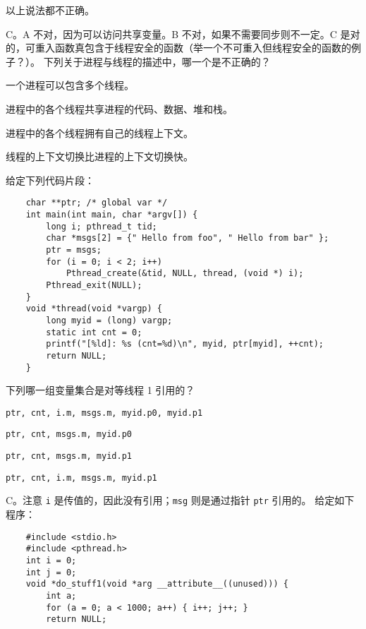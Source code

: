 \begin{problems}
\begin{choices}
            \item 以上说法都不正确。
        \end{choices}
        \sol C。A 不对，因为可以访问共享变量。B 不对，如果不需要同步则不一定。C 是对的，可重入函数真包含于线程安全的函数（举一个不可重入但线程安全的函数的例子？）。
         下列关于进程与线程的描述中，哪一个是不正确的？
        \begin{choices}
            \item 一个进程可以包含多个线程。
            \item 进程中的各个线程共享进程的代码、数据、堆和栈。
            \item 进程中的各个线程拥有自己的线程上下文。
            \item 线程的上下文切换比进程的上下文切换快。
        \end{choices}
         给定下列代码片段：
        \begin{verbatim}
    char **ptr; /* global var */
    int main(int main, char *argv[]) {
        long i; pthread_t tid;
        char *msgs[2] = {" Hello from foo", " Hello from bar" };
        ptr = msgs;
        for (i = 0; i < 2; i++)
            Pthread_create(&tid, NULL, thread, (void *) i);
        Pthread_exit(NULL);
    }
    void *thread(void *vargp) {
        long myid = (long) vargp;
        static int cnt = 0;
        printf("[%ld]: %s (cnt=%d)\n", myid, ptr[myid], ++cnt);
        return NULL;
    }
        \end{verbatim}
        下列哪一组变量集合是对等线程 1 引用的？
        \begin{choices}
            \item \verb|ptr, cnt, i.m, msgs.m, myid.p0, myid.p1|
            \item \verb|ptr, cnt, msgs.m, myid.p0|
            \item \verb|ptr, cnt, msgs.m, myid.p1|
            \item \verb|ptr, cnt, i.m, msgs.m, myid.p1|
        \end{choices}
        \sol C。注意 \verb|i| 是传值的，因此没有引用；\verb|msg| 则是通过指针 \verb|ptr| 引用的。
         给定如下程序：
        \begin{verbatim}
    #include <stdio.h>
    #include <pthread.h>
    int i = 0;
    int j = 0;
    void *do_stuff1(void *arg __attribute__((unused))) {
        int a;
        for (a = 0; a < 1000; a++) { i++; j++; }
        return NULL;

\end{verbatim}
\end{problems}
